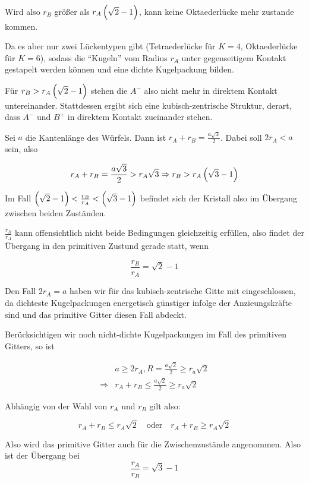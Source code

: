 \documentclass[a4paper,german,12pt,smallheadings]{scrartcl}
\begin{document}
Wird also $r_B$ größer als $r_A \del{\sqrt{2} - 1}$, kann keine Oktaederlücke
mehr zustande kommen.

Da es aber nur zwei Lückentypen gibt (Tetraederlücke für $K = 4$, Oktaederlücke
für $K = 6$), sodass die ``Kugeln'' vom Radius $r_A$ unter gegenseitigem
Kontakt gestapelt werden können und eine dichte Kugelpackung bilden.

Für $r_B > r_A \del{\sqrt{2} - 1}$ stehen die $A^-$ also nicht mehr in direktem
Kontakt untereinander. Stattdessen ergibt sich eine kubisch-zentrische
Struktur, derart, dass $A^-$ und $B^+$ in direktem Kontakt zueinander stehen.

Sei $a$ die Kantenlänge des Würfels. Dann ist $r_A + r_B = \frac{a
\sqrt{3}}{2}$. Dabei soll $2 r_A < a$ sein, also

\begin{equation}
  r_A + r_B = \frac{a \sqrt{3}}{2} > r_A \sqrt{3} \Rightarrow r_B > r_A \del{\sqrt{3} - 1}
\end{equation}

Im Fall $\del{ \sqrt{2} - 1 } < \frac{r_B}{r_A}  < \del{\sqrt{3} - 1}$ befindet
sich der Kristall also im Übergang zwischen beiden Zuständen.

$\frac{r_B}{r_A}$ kann offensichtlich nicht beide Bedingungen gleichzeitig
erfüllen, also findet der Übergang in den primitiven Zustund gerade statt, wenn

\begin{equation}
  \frac{r_B}{r_A} = \sqrt{2} - 1
\end{equation}

Den Fall $2 r_A = a$ haben wir für das kubisch-zentrische Gitte mit
eingeschlossen, da dichteste Kugelpackungen energetisch günstiger infolge der
Anzieungskräfte sind und das primitive Gitter diesen Fall abdeckt.

Berücksichtigen wir noch nicht-dichte Kugelpackungen im Fall des primitiven
Gitters, so ist

\begin{align*}
  &a \ge 2 r_A, R = \frac{a \sqrt{2}}{2} \ge r_a \sqrt{2} \\
  \Rightarrow & r_A + r_B \le \frac{a \sqrt{2}}{2} \ge r_a \sqrt{2}
\end{align*}

Abhängig von der Wahl von $r_A$ und $r_B$ gilt also:

\begin{equation}
  r_A + r_B \le r_A \sqrt{2} \quad \text{oder} \quad r_A + r_B \ge r_A \sqrt{2}
\end{equation}

Also wird das primitive Gitter auch für die Zwischenzustände angenommen. Also ist der Übergang bei
\begin{equation}
  \frac{r_A}{r_B} = \sqrt{3} - 1
\end{equation}
\end{document}
